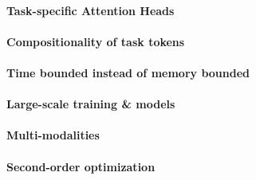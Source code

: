 \paragraph{Task-specific Attention Heads}

\paragraph{Compositionality of task tokens}

\paragraph{Time bounded instead of memory bounded}

\paragraph{Large-scale training \& models}

\paragraph{Multi-modalities}

\paragraph{Second-order optimization}

